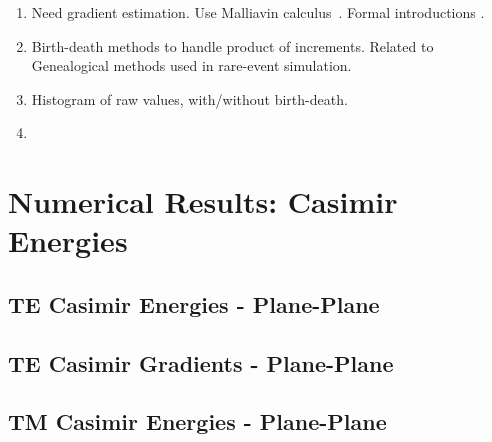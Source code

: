     \begin{enumerate}
      \item Need gradient estimation.  Use Malliavin calculus~\cite{Fournie1999, Chen2007,Kohatsu-Higa2003}.
        Formal introductions \cite{Nualart2006, Malliavin2006, DiNunno2009}.
      \item Birth-death methods to handle product of increments.  Related to Genealogical 
        methods used in rare-event simulation.  
      \item Histogram of raw values, with/without birth-death.
      \item 
    \end{enumerate}


\section{Numerical Results: Casimir Energies}

\subsection{TE Casimir Energies - Plane-Plane}

\subsection{TE Casimir Gradients - Plane-Plane}

\subsection{TM Casimir Energies - Plane-Plane}




    






